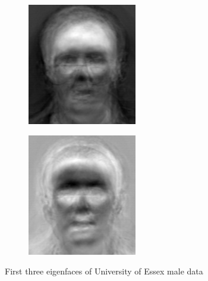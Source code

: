 \begin{figure}
\begin{subfigure}[b]{0.3\textwidth}
\includegraphics[width=\textwidth]{eigenface1.png}
\end{subfigure}
\begin{subfigure}[b]{0.3\textwidth}
\includegraphics[width=\textwidth]{eigenface2.png}
\end{subfigure}
\caption{First three eigenfaces of University of Essex male data}
\label{facialRecognition:eigenfaces}
\end{figure}
